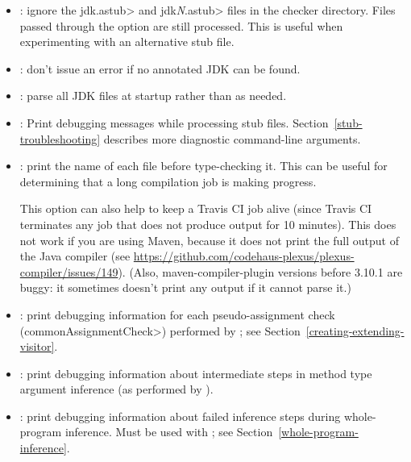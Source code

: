 
\begin{itemize}

\item {}:
  ignore the \<jdk.astub> and \<jdk\emph{N}.astub> files in the checker directory. Files passed
  through the  option are still processed. This is useful
  when experimenting with an alternative stub file.

\item {}:
  don't issue an error if no annotated JDK can be found.

\item {}:
  parse all JDK files at startup rather than as needed.

\item {}:
  Print debugging messages while processing stub files.
  Section~\ref{stub-troubleshooting} describes more diagnostic command-line
  arguments.

\end{itemize}


\begin{itemize}

\item {}: print the name of each file before type-checking it.
This can be useful for determining that a long compilation job is making
progress.

This option can also help to keep a Travis CI job alive (since Travis CI
terminates any job that does not produce output for 10 minutes).
This does not work if you are using Maven, because it does not print
the full output of the Java compiler (see \url{https://github.com/codehaus-plexus/plexus-compiler/issues/149}).
(Also, maven-compiler-plugin versions before 3.10.1 are buggy: it sometimes
doesn't print any output if it cannot parse it.)

\item {}: print debugging information for each
pseudo-assignment check (\<commonAssignmentCheck>) performed by
; see
Section~\ref{creating-extending-visitor}.

\item {}: print debugging information
about intermediate steps in method type argument inference
(as performed by ).

\item {}: print debugging information
about failed inference steps during whole-program inference. Must
be used with ; see Section~\ref{whole-program-inference}.

\end{itemize}

